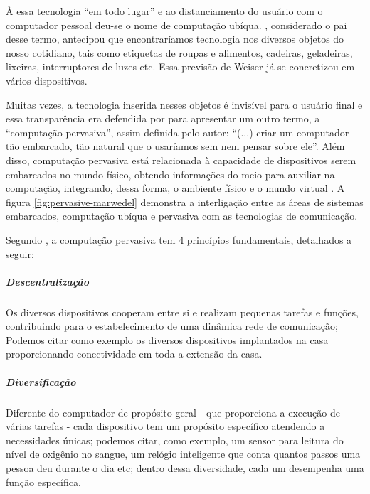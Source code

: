 À essa tecnologia ``em todo lugar'' e ao distanciamento do usuário com o
computador pessoal deu-se o nome de computação ubíqua.
, considerado o pai desse termo, antecipou que
encontraríamos tecnologia nos diversos objetos do nosso cotidiano, tais como
etiquetas de roupas e alimentos, cadeiras, geladeiras, lixeiras, interruptores
de luzes etc. Essa previsão de Weiser já se concretizou em vários dispositivos.


Muitas vezes, a tecnologia inserida nesses objetos é invisível para o usuário
final e essa transparência era defendida por  para
apresentar um outro termo, a ``computação pervasiva'', assim definida pelo
autor: ``(...) criar  um computador tão embarcado, tão natural que o usaríamos
sem nem pensar sobre ele''. Além disso, computação pervasiva está relacionada à
capacidade de dispositivos serem embarcados no mundo físico, obtendo
informações do meio para auxiliar na computação, integrando, dessa forma, o
ambiente físico e o mundo virtual \cite{bolsoni2009computaccao,
de2003computaccao}. A figura  \ref{fig:pervasive-marwedel} demonstra a
interligação entre as áreas de sistemas embarcados, computação ubíqua e
pervasiva com as tecnologias de comunicação.

Segundo , a computação pervasiva tem 4 princípios 
fundamentais, detalhados a seguir: 

\subparagraph{Descentralização} 

Os diversos dispositivos cooperam entre si e realizam
pequenas tarefas e funções, contribuindo para o estabelecimento de uma 
dinâmica rede de comunicação; Podemos citar como exemplo os diversos 
dispositivos implantados na casa proporcionando conectividade em toda
a extensão da casa.

\subparagraph{Diversificação} 

Diferente do computador de propósito geral - que 
proporciona a execução de várias tarefas - cada dispositivo tem um propósito
específico atendendo a necessidades únicas; podemos citar, como exemplo, um
sensor para leitura do nível de oxigênio no sangue, um relógio inteligente
que conta quantos passos uma pessoa deu durante o dia etc; dentro dessa 
diversidade, cada um desempenha uma função específica.

